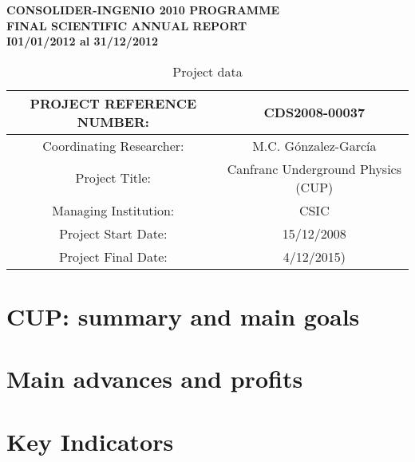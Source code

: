 \documentclass[a4paper,11pt,oneside]{article}
\begin{document}


\begin{center}
{\LARGE \bf \textsf{CONSOLIDER-INGENIO 2010 PROGRAMME }} \\ \vspace{0.5cm}
{\Large \bf \textsf{FINAL SCIENTIFIC ANNUAL REPORT}} \\ \vspace{0.5cm}
{\Large \bf \textsf{I01/01/2012 al 31/12/2012 }} \\ \vspace{2cm}
\end{center}


\begin{table}[htp!]
\begin{center}
\begin{tabular}{|c|c|}
\hline
PROJECT REFERENCE NUMBER: & CDS2008-00037\\
\hline
Coordinating Researcher:  & M.C. G\'onzalez-Garc\'ia \\
Project Title: & Canfranc Underground Physics (CUP) \\
Managing Institution:  & CSIC \\
Project Start Date:  & 15/12/2008\\
Project Final Date: &  4/12/2015)\\
\hline\hline
\end{tabular}
\end{center}
\caption{Project data}
\label{default}
\end{table}%

\newpage

\section{\bf \textsf{CUP: summary and main goals }}
\label{sec.advances}


\section{\bf \textsf{Main advances and profits }}
\label{sec.advances}


\section{\bf \textsf{ Key Indicators}}
\label{sec.indicators}

\end{document}
